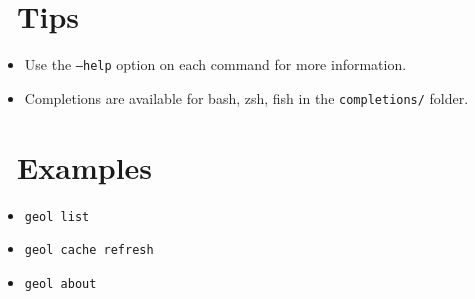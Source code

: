 \documentclass[a4paper,10pt]{article}
\newcommand{\cmd}[1]{\textcolor{geolgreen}{\texttt{#1}}}
\newenvironment{geolitemize}{%
  \begin{itemize}\setlength{\itemsep}{0.1em}\setlength{\parskip}{0pt}\setlength{\topsep}{0pt}
}{\end{itemize}}
\begin{document}
\begin{multicols}{2}
\section*{\faLightbulb[regular]\ Tips}
\begin{geolbox}
\begin{geolitemize}
  \item Use the \cmd{--help} option on each command for more information.
  \item Completions are available for bash, zsh, fish in the \cmd{completions/} folder.
\end{geolitemize}
\end{geolbox}

\section*{\faListUl\ Examples}
\begin{geolbox}
\begin{geolitemize}
  \item \cmd{geol list}
  \item \cmd{geol cache refresh}
  \item \cmd{geol about}
\end{geolitemize}
\end{geolbox}

\end{multicols}
\end{document}
